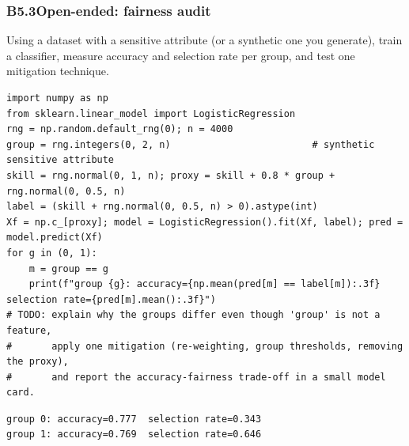 \documentclass[11pt]{article}
\begin{document}
\subsubsection*{B5.3\quad Open-ended: fairness audit}
Using a dataset with a sensitive attribute (or a synthetic one you generate), train a classifier, measure accuracy and selection rate per group, and test one mitigation technique.
\begin{lstlisting}[style=py]
import numpy as np
from sklearn.linear_model import LogisticRegression
rng = np.random.default_rng(0); n = 4000
group = rng.integers(0, 2, n)                         # synthetic sensitive attribute
skill = rng.normal(0, 1, n); proxy = skill + 0.8 * group + rng.normal(0, 0.5, n)
label = (skill + rng.normal(0, 0.5, n) > 0).astype(int)
Xf = np.c_[proxy]; model = LogisticRegression().fit(Xf, label); pred = model.predict(Xf)
for g in (0, 1):
    m = group == g
    print(f"group {g}: accuracy={np.mean(pred[m] == label[m]):.3f}  selection rate={pred[m].mean():.3f}")
# TODO: explain why the groups differ even though 'group' is not a feature,
#       apply one mitigation (re-weighting, group thresholds, removing the proxy),
#       and report the accuracy-fairness trade-off in a small model card.
\end{lstlisting}
\begin{lstlisting}[style=out]
group 0: accuracy=0.777  selection rate=0.343
group 1: accuracy=0.769  selection rate=0.646
\end{lstlisting}
\newpage
\end{document}
